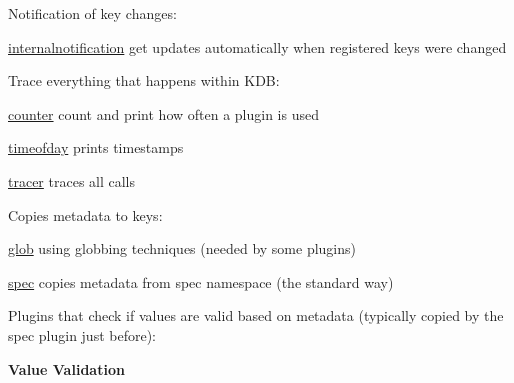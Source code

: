 Notification of key changes\+:


\begin{DoxyItemize}
\item \mbox{\hyperlink{autotoc_md321_src_plugins_internalnotification_README_md}{internalnotification}} get updates automatically when registered keys were changed
\end{DoxyItemize}

Trace everything that happens within K\+DB\+:


\begin{DoxyItemize}
\item \mbox{\hyperlink{autotoc_md108_src_plugins_counter_README_md}{counter}} count and print how often a plugin is used
\item \mbox{\hyperlink{autotoc_md689_src_plugins_timeofday_README_md}{timeofday}} prints timestamps
\item \mbox{\hyperlink{autotoc_md692_src_plugins_tracer_README_md}{tracer}} traces all calls
\end{DoxyItemize}

Copies metadata to keys\+:


\begin{DoxyItemize}
\item \mbox{\hyperlink{autotoc_md243_src_plugins_glob_README_md}{glob}} using globbing techniques (needed by some plugins)
\item \mbox{\hyperlink{autotoc_md644_src_plugins_spec_README_md}{spec}} copies metadata from spec namespace (the standard way)
\end{DoxyItemize}

Plugins that check if values are valid based on metadata (typically copied by the {\ttfamily spec} plugin just before)\+:

{\bfseries{Value Validation}}


